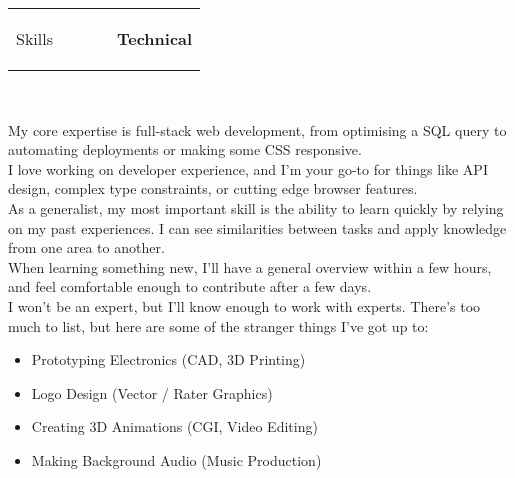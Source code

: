 \documentclass[hidelinks, 12pt, a4paper]{article}
\begin{document}
	\vspace{24pt}
	\begin{tabularx}{\textwidth}{@{}llXrr@{}}
		\begin{Large}Skills\end{Large}&
		\rule{80pt}{1pt}&&
		\rule{63pt}{1pt}&
		\textbf{Technical}
	\end{tabularx}\\
	
	\begin{multicols}{2}
		My core expertise is full-stack web development, from optimising a SQL query to automating deployments or making some CSS responsive.\\
		
		I love working on developer experience, and I'm your go-to for things like API design, complex type constraints, or cutting edge browser features.\\
		
		As a generalist, my most important skill is the ability to learn quickly by relying on my past experiences.
		I can see similarities between tasks and apply knowledge from one area to another.\\
		
		When learning something new, I'll have a general overview within a few hours, and feel comfortable enough to contribute after a few days.\\
		
		I won't be an expert, but I'll know enough to work with experts.
		There's too much to list, but here are some of the stranger things I've got up to:\\
		
		\begin{itemize}[noitemsep,topsep=0pt,partopsep=0pt]
			\item \begin{small}Prototyping Electronics (CAD, 3D Printing)\end{small}
			\item \begin{small}Logo Design (Vector / Rater Graphics)\end{small}
			\item \begin{small}Creating 3D Animations (CGI, Video Editing)\end{small}
			\item \begin{small}Making Background Audio (Music Production)\end{small}\\
		\end{itemize}
		
	\end{multicols}
\end{document}
